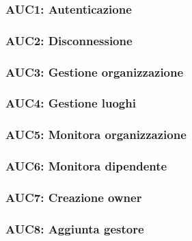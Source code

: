 \documentclass[../analisi-dei-requisiti.tex]{subfiles}
\begin{document}
\subsubsection{AUC1: Autenticazione}%
\label{subs:AUC1}



\subsubsection{AUC2: Disconnessione}%
\label{subs:AUC2}



\subsubsection{AUC3: Gestione organizzazione}%
\label{subs:AUC3}



\subsubsection{AUC4: Gestione luoghi}%
\label{subs:AUC4}



\subsubsection{AUC5: Monitora organizzazione}%
\label{subs:AUC5}



\subsubsection{AUC6: Monitora dipendente}%
\label{subs:AUC6}



\subsubsection{AUC7: Creazione owner}%
\label{subs:AUC7}



\subsubsection{AUC8: Aggiunta gestore}%
\label{subs:AUC8}
\end{document}

